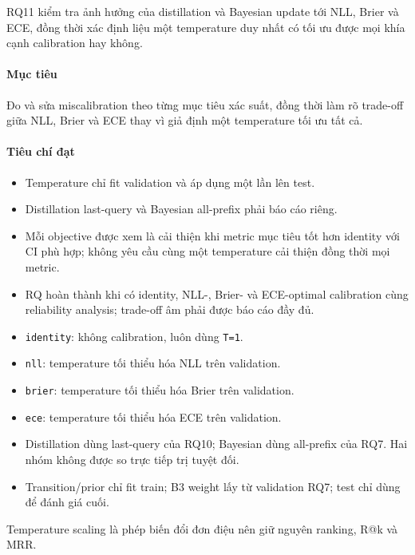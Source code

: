 RQ11 kiểm tra ảnh hưởng của distillation và Bayesian update tới NLL, Brier và ECE, đồng thời xác định liệu một temperature duy nhất có tối ưu được mọi khía cạnh calibration hay không.

\paragraph{Mục tiêu}

Đo và sửa miscalibration theo từng mục tiêu xác suất, đồng thời làm rõ trade-off giữa NLL, Brier và ECE thay vì giả định một temperature tối ưu tất cả.

\paragraph{Tiêu chí đạt}

\begin{itemize}
\item Temperature chỉ fit validation và áp dụng một lần lên test.
\item Distillation last-query và Bayesian all-prefix phải báo cáo riêng.
\item Mỗi objective được xem là cải thiện khi metric mục tiêu tốt hơn identity với
CI phù hợp; không yêu cầu cùng một temperature cải thiện đồng thời mọi metric.

\item RQ hoàn thành khi có identity, NLL-, Brier- và ECE-optimal calibration cùng
reliability analysis; trade-off âm phải được báo cáo đầy đủ.

\end{itemize}

\begin{itemize}
\item \texttt{identity}: không calibration, luôn dùng \texttt{T=1}.
\item \texttt{nll}: temperature tối thiểu hóa NLL trên validation.
\item \texttt{brier}: temperature tối thiểu hóa Brier trên validation.
\item \texttt{ece}: temperature tối thiểu hóa ECE trên validation.
\item Distillation dùng last-query của RQ10; Bayesian dùng all-prefix của RQ7. Hai nhóm không được so trực tiếp trị tuyệt đối.
\item Transition/prior chỉ fit train; B3 weight lấy từ validation RQ7; test chỉ dùng để đánh giá cuối.
\end{itemize}

Temperature scaling là phép biến đổi đơn điệu nên giữ nguyên ranking, R@k và MRR.


